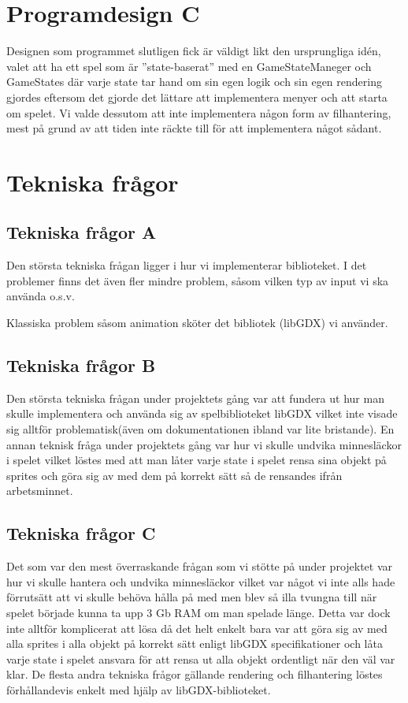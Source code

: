 \documentclass[a4paper,11pt]{article}
\begin{document}
\section{Programdesign C}
Designen som programmet slutligen fick är väldigt likt den ursprungliga idén, valet att ha ett spel som är ”state-baserat” med en GameStateManeger och GameStates där varje state tar hand om sin egen logik och sin egen rendering gjordes eftersom det gjorde det lättare att implementera menyer och att starta om spelet. Vi valde dessutom att inte implementera någon form av filhantering, mest på grund av att tiden inte räckte till för att implementera något sådant.

\section{Tekniska frågor}
\subsection{Tekniska frågor A}
Den största tekniska frågan ligger i hur vi implementerar biblioteket. I det problemer finns det även fler mindre problem, såsom vilken typ av input vi ska använda o.s.v. 

Klassiska problem såsom animation sköter det bibliotek (libGDX) vi använder.

\subsection{Tekniska frågor B}
Den största tekniska frågan under projektets gång var att fundera ut hur man skulle implementera och använda sig av spelbiblioteket libGDX vilket inte visade sig alltför problematisk(även om dokumentationen ibland var lite bristande). En annan teknisk fråga under projektets gång var hur vi skulle undvika minnesläckor i spelet vilket löstes med att man låter varje state i spelet rensa sina objekt på sprites och göra sig av med dem på korrekt sätt så de rensandes ifrån arbetsminnet.

\subsection{Tekniska frågor C}
Det som var den mest överraskande frågan som vi stötte på under projektet var hur vi skulle hantera och undvika minnesläckor vilket var något vi inte alls hade förrutsätt att vi skulle behöva hålla på med men blev så illa tvungna till när spelet började kunna ta upp 3 Gb RAM om man spelade länge. Detta var dock inte alltför komplicerat att lösa då det helt enkelt bara var att göra sig av med alla sprites i alla objekt på korrekt sätt enligt libGDX specifikationer och låta varje state i spelet ansvara för att rensa ut alla objekt ordentligt när den väl var klar. De flesta andra tekniska frågor gällande rendering och filhantering löstes förhållandevis enkelt med hjälp av libGDX-biblioteket.
\end{document}
